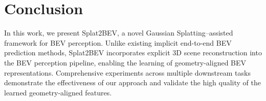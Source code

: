 \section{Conclusion}
\label{sec:conclusion}
In this work, we present Splat2BEV, a novel Gaussian Splatting–assisted framework for BEV perception. Unlike existing implicit end-to-end BEV prediction methods,
Splat2BEV incorporates explicit 3D scene reconstruction into the BEV perception pipeline, enabling the learning of geometry-aligned BEV representations.
Comprehensive experiments across multiple downstream tasks demonstrate the effectiveness of our approach and validate the high quality of the learned geometry-aligned features. 